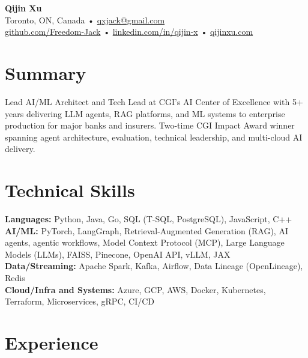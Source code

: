 \documentclass[letterpaper,11pt]{article}
\begin{document}
\vspace*{-1.2\baselineskip}

\begin{center}
    {\LARGE \textbf{Qijin Xu}}\\
    \vspace{3pt}
    Toronto, ON, Canada • \href{mailto:qxjack@gmail.com}{qxjack@gmail.com} \\
    \href{https://github.com/Freedom-Jack}{github.com/Freedom-Jack} • \href{https://www.linkedin.com/in/qijin-x-4899671a9/}{linkedin.com/in/qijin-x} • \href{https://qijinxu.com/}{qijinxu.com}
\end{center}

\vspace{-10pt}

\section{Summary}
Lead AI/ML Architect and Tech Lead at CGI's AI Center of Excellence with 5+ years delivering LLM agents, RAG platforms, and ML systems to enterprise production for major banks and insurers. Two-time CGI Impact Award winner spanning agent architecture, evaluation, technical leadership, and multi-cloud AI delivery.

\section{Technical Skills}
\vspace{2pt}
\textbf{Languages:} Python, Java, Go, SQL (T-SQL, PostgreSQL), JavaScript, C++ \\
\textbf{AI/ML:} PyTorch, LangGraph, Retrieval-Augmented Generation (RAG), AI agents, agentic workflows, Model Context Protocol (MCP), Large Language Models (LLMs), FAISS, Pinecone, OpenAI API, vLLM, JAX \\
\textbf{Data/Streaming:} Apache Spark, Kafka, Airflow, Data Lineage (OpenLineage), Redis \\
\textbf{Cloud/Infra and Systems:} Azure, GCP, AWS, Docker, Kubernetes, Terraform, Microservices, gRPC, CI/CD

\section{Experience}
\end{document}
